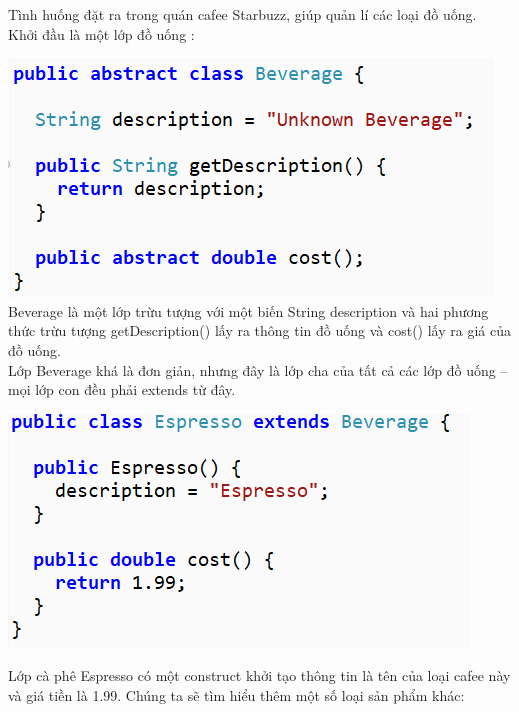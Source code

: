 Tình huống đặt ra trong quán cafee Starbuzz, giúp quản lí các loại đồ uống.\\
Khởi đầu là một lớp đồ uống :\\
\begin{multicols}{2}
	\includegraphics[width=1\columnwidth]{GALLEYS/images/chapter4/images1}\\
	
	Beverage là một lớp trừu tượng với một biến String description và hai phương thức trừu tượng getDescription() lấy ra thông tin đồ uống và cost() lấy ra giá của đồ uống.\\
	
	Lớp Beverage khá là đơn giản, nhưng đây là lớp cha của tất cả các lớp đồ uống – mọi lớp con đều phải extends từ đây.
	
\end{multicols}
\begin{center}
	\includegraphics{GALLEYS/images/chapter4/images3}
\end{center}
Lớp cà phê Espresso có một construct khởi tạo thông tin là tên của loại cafee này và giá tiền là 1.99. 
Chúng ta sẽ tìm hiểu thêm một số loại sản phẩm khác:
